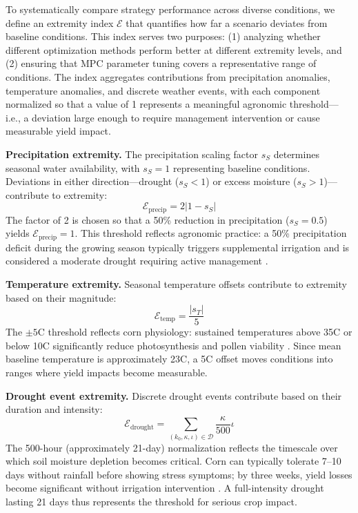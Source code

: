 \documentclass[preprint,12pt]{elsarticle}
\newcommand{\df}[2]{\displaystyle\frac{#1}{#2}}
\begin{document}
To systematically compare strategy performance across diverse conditions, we define an extremity index $\mathcal{E}$ that quantifies how far a scenario deviates from baseline conditions. This index serves two purposes: (1) analyzing whether different optimization methods perform better at different extremity levels, and (2) ensuring that MPC parameter tuning covers a representative range of conditions. The index aggregates contributions from precipitation anomalies, temperature anomalies, and discrete weather events, with each component normalized so that a value of 1 represents a meaningful agronomic threshold---i.e., a deviation large enough to require management intervention or cause measurable yield impact.

\noindent\textbf{Precipitation extremity.} The precipitation scaling factor $s_S$ determines seasonal water availability, with $s_S = 1$ representing baseline conditions. Deviations in either direction---drought ($s_S < 1$) or excess moisture ($s_S > 1$)---contribute to extremity:
\begin{equation}
\mathcal{E}_{\text{precip}} = 2|1 - s_{S}|
\label{eqn:extreme-precip}
\end{equation}
The factor of 2 is chosen so that a 50\% reduction in precipitation ($s_S = 0.5$) yields $\mathcal{E}_{\text{precip}} = 1$. This threshold reflects agronomic practice: a 50\% precipitation deficit during the growing season typically triggers supplemental irrigation and is considered a moderate drought requiring active management \cite{kranz2008irrigation}.

\noindent\textbf{Temperature extremity.} Seasonal temperature offsets contribute to extremity based on their magnitude:
\begin{equation}
\mathcal{E}_{\text{temp}} = \df{|s_{T}|}{5}
\label{eqn:extreme-temp}
\end{equation}
The $\pm 5$\textdegree C threshold reflects corn physiology: sustained temperatures above 35\textdegree C or below 10\textdegree C significantly reduce photosynthesis and pollen viability \cite{hatfield2015temperature}. Since mean baseline temperature is approximately 23\textdegree C, a 5\textdegree C offset moves conditions into ranges where yield impacts become measurable.

\noindent\textbf{Drought event extremity.} Discrete drought events contribute based on their duration and intensity:
\begin{equation}
\mathcal{E}_{\text{drought}} = \sum_{(k_{0}, \kappa, \iota)\in\mathcal{D}} \df{\kappa}{500}\iota
\label{eqn:extreme-drought}
\end{equation}
The 500-hour (approximately 21-day) normalization reflects the timescale over which soil moisture depletion becomes critical. Corn can typically tolerate 7--10 days without rainfall before showing stress symptoms; by three weeks, yield losses become significant without irrigation intervention \cite{kranz2008irrigation}. A full-intensity drought lasting 21 days thus represents the threshold for serious crop impact.
\end{document}
